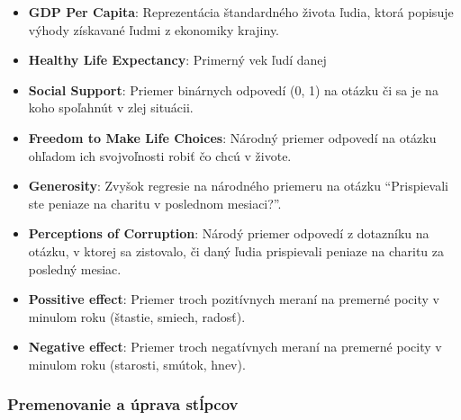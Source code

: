 \documentclass[
]{article}
\begin{document}
\begin{itemize}
\item
  \textbf{GDP Per Capita}: Reprezentácia štandardného života ľudia,
  ktorá popisuje výhody získavané ľudmi z ekonomiky krajiny.
\item
  \textbf{Healthy Life Expectancy}: Primerný vek ľudí danej
\item
  \textbf{Social Support}: Priemer binárnych odpovedí (0, 1) na otázku
  či sa je na koho spoľahnút v zlej situácii.
\item
  \textbf{Freedom to Make Life Choices}: Národný priemer odpovedí na
  otázku ohľadom ich svojvoľnosti robiť čo chcú v živote.
\item
  \textbf{Generosity}: Zvyšok regresie na národného priemeru na otázku
  ``Prispievali ste peniaze na charitu v poslednom mesiaci?''.
\item
  \textbf{Perceptions of Corruption}: Národý priemer odpovedí z
  dotazníku na otázku, v ktorej sa zistovalo, či daný ľudia prispievali
  peniaze na charitu za posledný mesiac.
\item
  \textbf{Possitive effect}: Priemer troch pozitívnych meraní na
  premerné pocity v minulom roku (štastie, smiech, radosť).
\item
  \textbf{Negative effect}: Priemer troch negatívnych meraní na premerné
  pocity v minulom roku (starosti, smútok, hnev).
\end{itemize}

\hypertarget{premenovanie-a-uxfaprava-stux13apcov}{%
\subsubsection{Premenovanie a úprava
stĺpcov}\label{premenovanie-a-uxfaprava-stux13apcov}}
\end{document}
